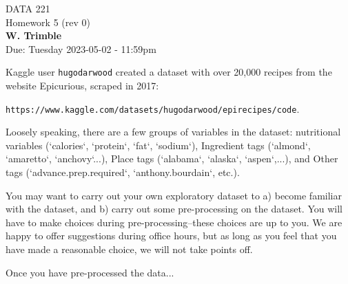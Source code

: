\documentclass[12pt]{book}
\theoremstyle{definition}
\begin{document}
\begin{center}
{\Large DATA 221 \\  Homework 5  (rev 0)}\\
\textbf{W. Trimble}\\ %
Due: Tuesday 2023-05-02  - 11:59pm
\end{center}

\vspace{0.2 cm}



Kaggle user \texttt{hugodarwood} created a dataset with over 20,000 recipes from the website Epicurious, scraped in 2017:

\texttt{https://www.kaggle.com/datasets/hugodarwood/epirecipes/code}. 

Loosely speaking, there are a few groups of variables in the dataset: nutritional variables (`calories`, `protein`, `fat`, `sodium`),  Ingredient tags (`almond`, `amaretto`, `anchovy`...), Place tags (`alabama`, `alaska`, `aspen`,...), and Other tags (`advance.prep.required`, `anthony.bourdain`, etc.).

You may want to carry out your own exploratory dataset to a) become familiar with the dataset, and b) carry out some pre-processing on the dataset. You will have to make choices during pre-processing--these choices are up to you. We are happy to offer suggestions during office hours, but as long as you feel that you have made a reasonable choice, we will not take points off.   

Once you have pre-processed the data...
\end{document}
